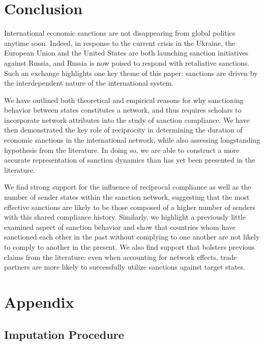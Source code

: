 \section*{Conclusion}
\label{conclusion}

International economic sanctions are not disappearing from global politics anytime soon. Indeed, in response to the current crisis in the Ukraine, the European Union and the United States are both launching sanction initiatives against Russia, and Russia is now poised to respond with retaliative sanctions. Such an exchange highlights one key theme of this paper: sanctions are driven by the interdependent nature of the international system. 

 We have outlined both theoretical and empirical reasons for why sanctioning behavior between states constitutes a network, and thus requires scholars to incorporate network attributes into the study of sanction compliance. We have then demonstrated the key role of reciprocity in determining the duration of economic sanctions in the international network, while also assessing longstanding hypothesis from the literature. In doing so, we are able to construct a more accurate representation of sanction dynamics than has yet been presented in the literature. 

We find strong support for the influence of reciprocal compliance as well as the number of sender states within the sanction network, suggesting that the most effective sanctions are likely to be those composed of a higher number of senders with this shared compliance history. Similarly, we highlight a previously little examined aspect of sanction behavior and show that countries whom have sanctioned each other in the past without complying to one another are not likely to comply to another in the present. We also find support that bolsters previous claims from the literature: even when accounting for network effects, trade partners are more likely to successfully utilize sanctions against target states.  


\newpage
\section*{Appendix}
\label{appendix}

\subsection*{Imputation Procedure}

